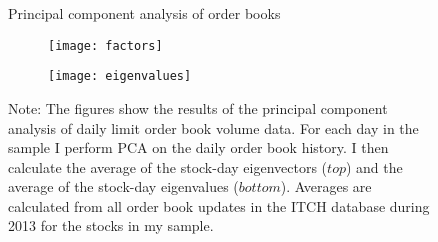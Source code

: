 \begin{figure}[p]
\linespread{1}
\centering
\captionsetup{labelsep=colon, font=footnotesize, justification=centerfirst, width=\linewidth}
\caption{Principal component analysis of order books}
\label{fig:pca}
\begin{subfigure}[t]{1.00\textwidth}
\texttt{[image: factors]}
\end{subfigure}
\begin{subfigure}[b]{1.00\textwidth}
\texttt{[image: eigenvalues]}
\end{subfigure}
\captionsetup{font=footnotesize, justification=justified, width=\linewidth}
\caption*{Note: The figures show the results of the principal component analysis of daily limit order book volume data. For each day in the sample I perform PCA on the daily order book history. I then calculate the average of the stock-day eigenvectors ($top$) and the average of the stock-day eigenvalues ($bottom$). Averages are calculated from all order book updates in the ITCH database during 2013 for the stocks in my sample.}
\end{figure}
